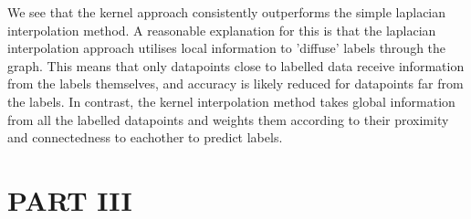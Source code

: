 \documentclass[12pt]{article}
\begin{document}
We see that the kernel approach consistently outperforms the simple laplacian
 interpolation method. A reasonable explanation for this is that the laplacian
interpolation approach utilises local information to 'diffuse' labels through the graph. 
This means that only datapoints close to labelled data receive information from the 
labels themselves, and accuracy is likely reduced for datapoints far from the labels.
In contrast, the kernel interpolation method takes global information from all the 
labelled datapoints and weights them according to their proximity and connectedness 
to eachother to predict labels.
\newpage



\section{PART III}
\end{document}
